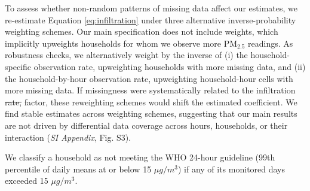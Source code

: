 \documentclass[9pt,twocolumn,twoside]{pnas-new}
\providecommand{\DIFadd}[1]{{\protect\color{red}#1}}
\providecommand{\DIFdel}[1]{{\protect\color{red}\protect\sout{#1}}}
\begin{document}
To assess whether non-random patterns of missing data affect our estimates, we re-estimate Equation \ref{eq:infiltration} under three alternative inverse-probability weighting schemes. Our main specification does not include weights, which implicitly upweights households for whom we observe more PM$_{2.5}$ readings. As robustness checks, we alternatively weight by the inverse of (i) the household-specific observation rate, upweighting households with more missing data, and (ii) the household-by-hour observation rate, upweighting household-hour cells with more missing data. If missingness were systematically related to the infiltration \DIFdel{rate,} \DIFadd{factor,} these reweighting schemes would shift the estimated coefficient. We find stable estimates across weighting schemes, suggesting that our main results are not driven by differential data coverage across hours, households, or their interaction (\textit{SI Appendix}, Fig. S3).

\DIFadd{We classify a household as not meeting the WHO 24-hour guideline (99th percentile of daily means at or below 15 $\mu g/m^3$) if any of its monitored days exceeded 15 $\mu g/m^3$.} 
\end{document}
